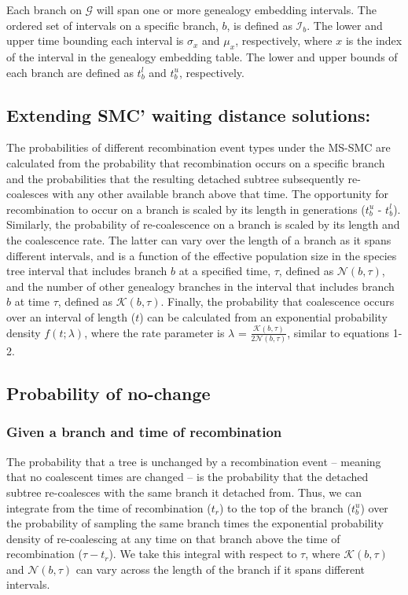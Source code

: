 \documentclass[11pt]{article}
\begin{document}
Each branch on $\mathcal{G}$ will span one or more genealogy embedding 
intervals. The ordered set of intervals on a specific branch, $b$, is 
defined as $\mathcal{I}_b$. The lower and upper time bounding each interval is 
$\sigma_x$ and $\mu_x$, respectively, where $x$ is the index of the 
interval in the genealogy embedding table. The lower and upper bounds of
each branch are defined as $t_b^l$ and $t_b^u$, respectively. 


\subsection{Extending SMC' waiting distance solutions:}

The probabilities of different recombination event types under the 
MS-SMC are calculated from the probability that recombination occurs on 
a specific branch and the probabilities that the resulting detached 
subtree subsequently re-coalesces with any other available branch above that time. 
The opportunity for recombination to occur on a branch is scaled by 
its length in generations ($t_b^u$ - $t_b^l$). Similarly, the 
probability of re-coalescence on a branch is scaled by its length
and the coalescence rate. The latter can vary over the length of a branch
as it spans different intervals, and is a function of the effective 
population size in the species tree interval that includes branch $b$ at
a specified time, $\tau$, defined as $\mathcal{N}(b,\tau)$, and the number of 
other genealogy branches in the interval that includes branch $b$ at time $\tau$,
defined as $\mathcal{K}(b,\tau)$.
Finally, the probability that coalescence occurs over an interval of length ($t$) 
can be calculated from an exponential probability density $f(t; \lambda)$, 
where the rate parameter is $\lambda$ = $\frac{\mathcal{K}(b,\tau)}{2\mathcal{N}(b,\tau)}$, 
similar to equations 1-2. 


\subsection{Probability of no-change}
\subsubsection{Given a branch and time of recombination}

The probability that a tree is unchanged by a recombination event -- meaning that 
no coalescent times are changed -- is the probability that the detached subtree 
re-coalesces with the same branch it detached from. Thus, we can integrate 
from the time of recombination ($t_r$) to the top of the branch ($t_b^u$) over the 
probability of sampling the same branch times the exponential probability density
of re-coalescing at any time on that branch above the time of recombination 
($\tau - t_r$). We take this integral with respect to $\tau$, where 
$\mathcal{K}(b,\tau)$ and $\mathcal{N}(b,\tau)$
can vary across the length of the branch if it spans different intervals.
\end{document}
